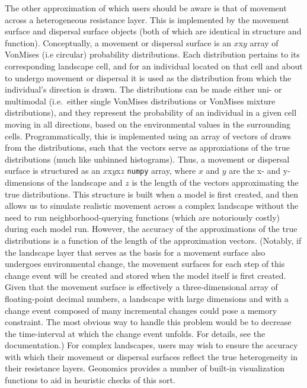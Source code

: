 ﻿\documentclass{article}
\begin{document}
The other approximation of which users should be aware
is that of movement across a heterogeneous resistance layer.
This is implemented by the movement surface and dispersal surface objects
(both of which are identical in structure and function).
Conceptually, a movement or dispersal surface is an $x$x$y$ array of VonMises (i.e circular)
probability distributions. Each distribution pertains to its corresponding landscape cell,
and for an individual located on that cell and about to undergo movement or dispersal
it is used as the distribution from which the individual's direction is drawn.
The distributions can be made either uni- or multimodal (i.e.\ either single VonMises distributions
or VonMises mixture distributions), and they represent the probability of an individual in a given
cell moving in all directions, based on the environmental values in the surrounding cells.
Programmatically, this is implemented using an array of vectors of draws from the distributions,
such that the vectors serve as approxiations of the true distributions (much like unbinned histograms).
Thus, a movement or dispersal surface is structured as an $x$x$y$x$z$ \texttt{numpy} array,
where $x$ and $y$ are the x- and y-dimensions of the landscape and $z$ is the length of the
vectors approximating the true distributions.
This structure is built when a model is first created, and then allows us to simulate realistic
movement across a complex landscape without the need to run neighborhood-querying functions
(which are notoriously costly) during each model run.
However, the accuracy of the approximations of the true distributions is a function of
the length of the approximation vectors.
(Notably, if the landscape layer that serves as the basis for a movement surface
also undergoes environmental change, the movement surfaces for each step of this
change event will be created and stored when the model itself is first created.
Given that the movement surface is effectively a three-dimensional array of
floating-point decimal numbers, a landscape with large dimensions and with
a change event composed of many incremental changes could pose a memory constraint.
The most obvious way to handle this problem would be to decrease the time-interval
at which the change event unfolds. For details, see the documentation.)
For complex landscapes, users may wish to ensure the accuracy with which their movement or
dispersal surfaces reflect the true heterogeneity in their resistance layers.
Geonomics provides a number of built-in visualization functions to aid in heuristic checks of this sort.
\end{document}
